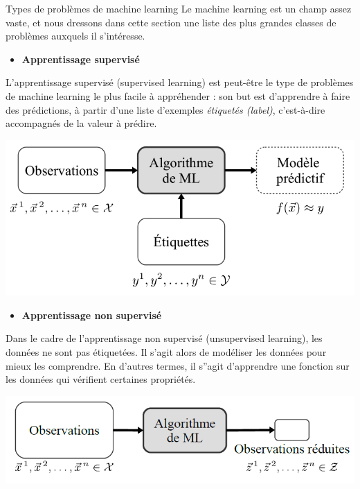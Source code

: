 \documentclass[
  10pt,
  ignorenonframetext,
]{beamer}
\providecommand{\tightlist}{%
  \setlength{\itemsep}{0pt}\setlength{\parskip}{0pt}}
\begin{document}
\begin{frame}{Types de problèmes de machine learning}
Le machine learning est un champ assez vaste, et nous dressons dans
cette section une liste des plus grandes classes de problèmes auxquels
il s'intéresse.

\begin{itemize}
\tightlist
\item
  \textbf{Apprentissage supervisé}
\end{itemize}

L'apprentissage supervisé (supervised learning) est peut-être le type de
problèmes de machine learning le plus facile à appréhender : son but est
d'apprendre à faire des prédictions, à partir d'une liste d'exemples
\emph{étiquetés (label)}, c'est-à-dire accompagnés de la valeur à
prédire.

\includegraphics{fig/fig1.png}
\end{frame}

\begin{frame}
\begin{itemize}
\tightlist
\item
  \textbf{Apprentissage non supervisé}
\end{itemize}

Dans le cadre de l'apprentissage non supervisé (unsupervised learning),
les données ne sont pas étiquetées. Il s'agit alors de modéliser les
données pour mieux les comprendre. En d'autres termes, il s''agit
d'apprendre une fonction sur les données qui vérifient certaines
propriétés.

\includegraphics{fig/fig2.png}
\end{frame}
\end{document}

